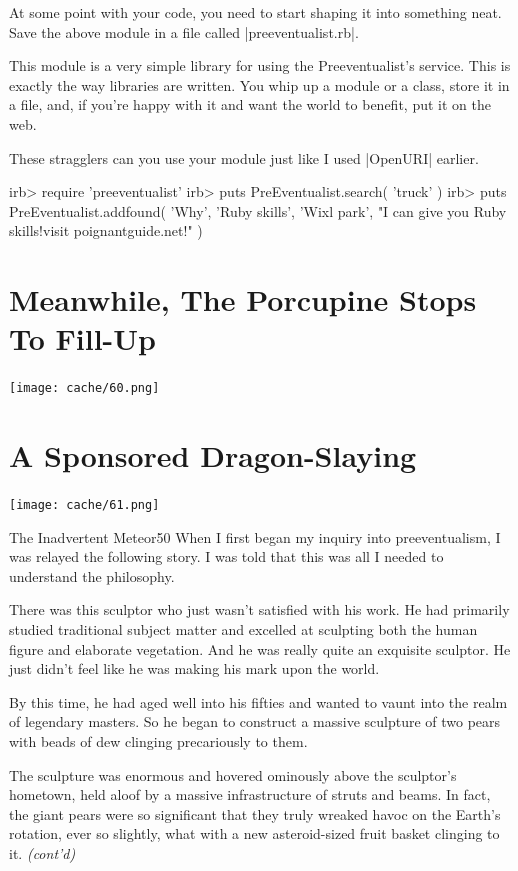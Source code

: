\documentclass[12pt,twoside]{report}
\begin{document}
At some point with your code, you need to start shaping it into
something neat.  Save the above module in a file called
\rubyinline|preeventualist.rb|.

This module is a very simple library for using the Preeventualist's
service.  This is exactly the way libraries are written.  You whip up
a module or a class, store it in a file, and, if you're happy with it
and want the world to benefit, put it on the web.

These stragglers can you use your module just like I used
\rubyinline|OpenURI| earlier.


\begin{consolecode}

 irb> require 'preeventualist'
 irb> puts PreEventualist.search( 'truck' )
 irb> puts PreEventualist.addfound( 'Why', 'Ruby skills', 'Wixl park',
        "I can give you Ruby skills!\nCome visit poignantguide.net!" )

\end{consolecode}



\section{Meanwhile, The Porcupine Stops To Fill-Up}


	\texttt{[image: cache/60.png]}

\newpage


\section{A Sponsored Dragon-Slaying}


	\texttt{[image: cache/61.png]}

	\begin{sidebar}{The Inadvertent Meteor}{50}
		When I first began my inquiry into preeventualism, I was relayed the following story. I was told that this was all I needed to understand the philosophy.\vspace{6pt}
		
		There was this sculptor who just wasn't satisfied with his work. He had primarily studied traditional subject matter and excelled at sculpting both the human figure and elaborate vegetation. And he was really quite an exquisite sculptor. He just didn't feel like he was making his mark upon the world.\vspace{6pt}
		
		By this time, he had aged well into his fifties and wanted to vaunt into the realm of legendary masters. So he began to construct a massive sculpture of two pears with beads of dew clinging precariously to them.\vspace{6pt}
		
		The sculpture was enormous and hovered ominously above the sculptor's hometown, held aloof by a massive infrastructure of struts and beams. In fact, the giant pears were so significant that they truly wreaked havoc on the Earth's rotation, ever so slightly, what with a new asteroid-sized fruit basket clinging to it. \textit{(cont'd)}
	\end{sidebar}
\end{document}
